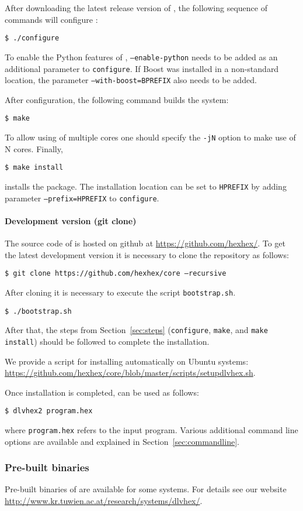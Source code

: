 \documentclass[a4paper, titlepage]{article}
\newcommand\leftaligned[1]{\par \smallskip #1 \smallskip \par}
\begin{document}
After downloading the latest release version of \dlvhex{},
the following sequence of commands \dlvhex{} will 
configure \dlvhex{}:
%
\leftaligned{\texttt{\$ \thinspace ./configure}} 
%
To enable the Python 
features of \dlvhex{}, \texttt{--enable-python} needs to be 
added as an additional parameter to \texttt{configure}.
%
If Boost was installed in a non-standard location,
the parameter \texttt{--with-boost=BPREFIX} also needs to be added.

After configuration, the following command builds the system:
%
\leftaligned{\texttt{\$ \thinspace make}} 
%
To allow using of multiple 
cores one should specify the \texttt{-jN} option to make 
use of N cores. Finally, 
%
\leftaligned{\texttt{\$ \thinspace make install}}
%
installs the package.
The installation location can be set to \texttt{HPREFIX}
by adding parameter \texttt{--prefix=HPREFIX} to \texttt{configure}.
   
\paragraph{Development version (git clone)}
The source code of \dlvhex{} is hosted on github at 
\url{https://github.com/hexhex/}. To get the latest 
development version it is necessary to clone the repository as 
follows:
%
\leftaligned{\texttt{\$ \thinspace
%
git clone 
https://github.com/hexhex/core --recursive}} 
After cloning it is necessary to 
execute the script \texttt{bootstrap.sh}.
%
\leftaligned{\texttt{\$ \thinspace ./bootstrap.sh}} 
%
After that, the steps from 
Section~\ref{sec:steps} (\texttt{configure}, \texttt{make}, and 
\texttt{make install}) should be followed to 
complete the installation.

We provide a script for installing \dlvhex{} 
automatically on Ubuntu systems:
\url{https://github.com/hexhex/core/blob/master/scripts/setupdlvhex.sh}.

Once installation is completed, \dlvhex{} can be used as follows:
%
\leftaligned{\texttt{\$ \thinspace dlvhex2 program.hex}} 
%
where \texttt{program.hex} refers to the input program.
Various additional command line options are available
and explained in Section~\ref{sec:commandline}.    

\subsubsection{Pre-built binaries}
Pre-built binaries of \dlvhex{} are available for some 
systems. For details see our website 
\url{http://www.kr.tuwien.ac.at/research/systems/dlvhex/}. 
\end{document}
